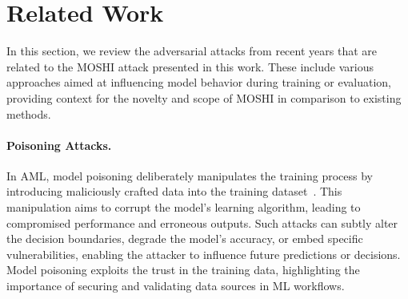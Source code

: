 \section{Related Work}
\label{sec:related}

In this section, we review the adversarial attacks from recent years that are related to the MOSHI attack presented in this work.
These include various approaches aimed at influencing model behavior during training or evaluation, providing context for the novelty and scope of MOSHI in comparison to existing methods.

\paragraph{Poisoning Attacks.}
In AML, model poisoning deliberately manipulates the training process by introducing maliciously crafted data into the training dataset~\cite{tian2022comprehensive}.
This manipulation aims to corrupt the model's learning algorithm, leading to compromised performance and erroneous outputs.
Such attacks can subtly alter the decision boundaries, degrade the model's accuracy, or embed specific vulnerabilities, enabling the attacker to influence future predictions or decisions.
Model poisoning exploits the trust in the training data, highlighting the importance of securing and validating data sources in ML workflows.

